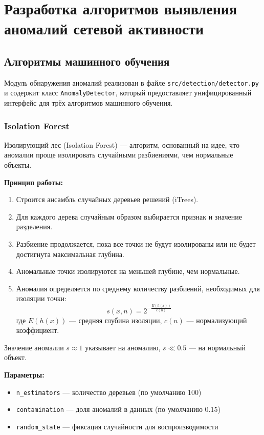 \chapter{Разработка алгоритмов выявления аномалий сетевой активности}

\section{Алгоритмы машинного обучения}

Модуль обнаружения аномалий реализован в файле \texttt{src/detection/detector.py} и содержит класс \texttt{AnomalyDetector}, который предоставляет унифицированный интерфейс для трёх алгоритмов машинного обучения.

\subsection{Isolation Forest}

Изолирующий лес (Isolation Forest) — алгоритм, основанный на идее, что аномалии проще изолировать случайными разбиениями, чем нормальные объекты.

\textbf{Принцип работы:}
\begin{enumerate}
    \item Строится ансамбль случайных деревьев решений (iTrees).
    \item Для каждого дерева случайным образом выбирается признак и значение разделения.
    \item Разбиение продолжается, пока все точки не будут изолированы или не будет достигнута максимальная глубина.
    \item Аномальные точки изолируются на меньшей глубине, чем нормальные.
    \item Аномалия определяется по среднему количеству разбиений, необходимых для изоляции точки:
    \[
    s(x, n) = 2^{-\frac{E(h(x))}{c(n)}}
    \]
    где \(E(h(x))\) — средняя глубина изоляции, \(c(n)\) — нормализующий коэффициент.
\end{enumerate}

Значение аномалии \(s \approx 1\) указывает на аномалию, \(s \ll 0.5\) — на нормальный объект.

\textbf{Параметры:}
\begin{itemize}
    \item \texttt{n\_estimators} — количество деревьев (по умолчанию 100)
    \item \texttt{contamination} — доля аномалий в данных (по умолчанию 0.15)
    \item \texttt{random\_state} — фиксация случайности для воспроизводимости
\end{itemize}

